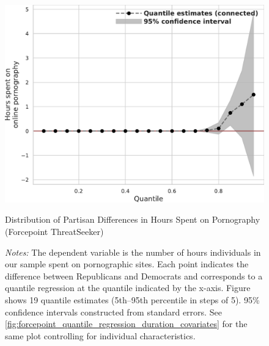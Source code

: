 \documentclass[12pt,twoside]{article}
\begin{document}
\begin{figure}[t]
	\centering
	\includegraphics[width=.6\linewidth]{figs/forcepoint_quantile_reg_duration_adult.pdf}
	\caption{Distribution of Partisan Differences in Hours Spent on Pornography (Forcepoint ThreatSeeker)}
	\caption*{\footnotesize \emph{Notes:} 
		The dependent variable is the number of hours individuals in our sample spent on pornographic sites.
		Each point indicates the difference between Republicans and Democrats and corresponds to a quantile regression at the quantile indicated by the x-axis.
  Figure shows 19 quantile estimates (5th--95th percentile in steps of 5).
		95\% confidence intervals constructed from standard errors.
		See \cref{fig:forcepoint_quantile_regression_duration_covariates} for the same plot controlling for individual characteristics.
	}
	\label{fig:forcepoint_quantile_regression_duration}
\end{figure}
\end{document}

